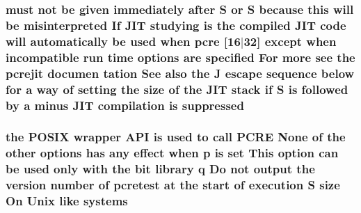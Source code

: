 \subsubsection[{\texorpdfstring{suppressed}{suppressed}}]{ must {\bf not} {\bf be} {\bf given} immediately {\bf after} {\bf S} {\bf or} {\bf S} because {\bf this} will {\bf be} misinterpreted If J\+IT {\bf studying} {\bf is} the {\bf compiled} J\+IT {\bf code} will automatically {\bf be} {\bf used} when {\bf pcre} \mbox{[}16$\vert$32\mbox{]} {\bf except} when incompatible {\bf run} {\bf time} {\bf options} {\bf are} {\bf specified} For more see the pcrejit documen tation See also the {\bf J} escape {\bf sequence} {\bf below} for {\bf a} {\bf way} {\bf of} {\bf setting} the {\bf size} {\bf of} the J\+IT {\bf stack} {\bf if} {\bf S} {\bf is} followed by {\bf a} minus J\+IT {\bf compilation} {\bf is} suppressed}\hypertarget{pcretest_8txt_a6ab3b4135a5a5c7be5906d3ee5df7724}{}\label{pcretest_8txt_a6ab3b4135a5a5c7be5906d3ee5df7724}
\subsubsection[{\texorpdfstring{systems}{systems}}]{\setlength{\rightskip}{0pt plus 5cm}the P\+O\+S\+IX wrapper {\bf A\+PI} {\bf is} {\bf used} {\bf to} call {\bf P\+C\+RE} None {\bf of} the other {\bf options} has {\bf any} effect when {\bf p} {\bf is} {\bf set} This {\bf option} {\bf can} {\bf be} {\bf used} only {\bf with} the {\bf bit} {\bf library} q Do {\bf not} {\bf output} the version {\bf number} {\bf of} {\bf pcretest} at the {\bf start} {\bf of} execution {\bf S} {\bf size} On Unix like systems}\hypertarget{pcretest_8txt_a10824cd39765967d500aad8915878804}{}\label{pcretest_8txt_a10824cd39765967d500aad8915878804}
